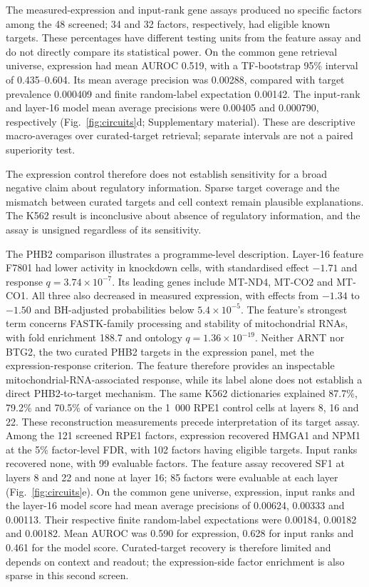 \documentclass[review,authoryear,12pt]{elsarticle}
\begin{document}
The measured-expression and input-rank gene assays produced no specific factors among the 48
screened; 34 and 32 factors, respectively, had eligible known targets. These percentages have
different testing units from the feature assay and do not directly compare its statistical power.
On the common gene retrieval universe, expression had mean AUROC 0.519, with a TF-bootstrap
95\% interval of 0.435--0.604. Its mean average precision was 0.00288, compared with target
prevalence 0.000409 and finite random-label expectation 0.00142. The input-rank and layer-16 model
mean average precisions were 0.00405 and 0.000790, respectively (Fig.~\ref{fig:circuits}d;
Supplementary material). These are descriptive macro-averages over curated-target retrieval;
separate intervals are not a paired superiority test.

The expression control therefore does not establish sensitivity for a broad negative claim about
regulatory information. Sparse target coverage and the mismatch between curated targets and cell
context remain plausible explanations. The K562 result is inconclusive about absence of regulatory
information, and the assay is unsigned regardless of its sensitivity.

The PHB2 comparison illustrates a programme-level description. Layer-16 feature F7801 had lower
activity in knockdown cells, with standardised effect $-1.71$ and response $q=3.74\times10^{-7}$.
Its leading genes include MT-ND4, MT-CO2 and MT-CO1. All three also decreased in measured expression,
with effects from $-1.34$ to $-1.50$ and BH-adjusted probabilities below $5.4\times10^{-5}$.
The feature's strongest term concerns FASTK-family processing and stability of mitochondrial RNAs,
with fold enrichment 188.7 and ontology $q=1.36\times10^{-19}$. Neither ARNT nor BTG2, the two
curated PHB2 targets in the expression panel, met the expression-response criterion. The feature
therefore provides an inspectable mitochondrial-RNA-associated response, while its label alone
does not establish a direct PHB2-to-target mechanism.
The same K562 dictionaries explained 87.7\%, 79.2\% and 70.5\% of variance on the 1~000 RPE1
control cells at layers 8, 16 and 22. These reconstruction measurements precede interpretation
of its target assay.
Among the 121 screened RPE1 factors, expression recovered HMGA1 and NPM1 at the 5\% factor-level
FDR, with 102 factors having eligible targets. Input ranks recovered none, with 99 evaluable
factors. The feature assay recovered SF1 at layers 8 and 22 and none at layer 16; 85 factors
were evaluable at each layer (Fig.~\ref{fig:circuits}e). On the common gene universe,
expression, input ranks and the layer-16 model score had mean average precisions of 0.00624,
0.00333 and 0.00113. Their respective finite random-label expectations were 0.00184, 0.00182
and 0.00182. Mean AUROC was 0.590 for expression, 0.628 for input ranks and 0.461 for the
model score. Curated-target recovery is therefore limited and depends on context and readout;
the expression-side factor enrichment is also sparse in this second screen.
\end{document}
